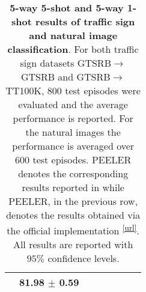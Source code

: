 \begin{table}[ht]
{\begin{tabular}{llllllll}
& \textbf{81.98 $\pm$ 0.59}   \\ 
\bottomrule
\end{tabular}
}
\caption{\textbf{5-way 5-shot and 5-way 1-shot results of traffic sign and natural image classification}. For both traffic sign datasets GTSRB$\rightarrow$GTSRB and GTSRB$\rightarrow$TT100K, $800$ test episodes were evaluated and the average performance is reported. For the natural images the performance is averaged over $600$ test episodes. PEELER \textsuperscript{\textdied} denotes the corresponding results reported in \cite{peeler} while PEELER, in the previous row, denotes the results obtained via the official implementation \textsuperscript{\ref{url}}. All results are reported with $95\%$ confidence levels.}
\label{tab:traffic}
\vskip -0.1in
\end{table}